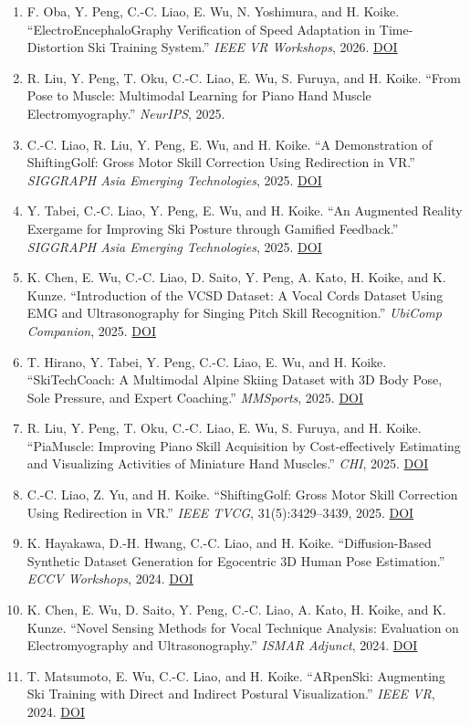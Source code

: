\documentclass[10pt,a4paper]{article}
\newcommand{\pub}[1]{\item #1}
\begin{document}
\begin{enumerate}
  \pub{F. Oba, Y. Peng, C.-C. Liao, E. Wu, N. Yoshimura, and H. Koike. ``ElectroEncephaloGraphy Verification of Speed Adaptation in Time-Distortion Ski Training System.'' \textit{IEEE VR Workshops}, 2026. \href{https://doi.org/10.1109/VRW70859.2026.00122}{DOI}}
  \pub{R. Liu, Y. Peng, T. Oku, C.-C. Liao, E. Wu, S. Furuya, and H. Koike. ``From Pose to Muscle: Multimodal Learning for Piano Hand Muscle Electromyography.'' \textit{NeurIPS}, 2025.}
  \pub{C.-C. Liao, R. Liu, Y. Peng, E. Wu, and H. Koike. ``A Demonstration of ShiftingGolf: Gross Motor Skill Correction Using Redirection in VR.'' \textit{SIGGRAPH Asia Emerging Technologies}, 2025. \href{https://doi.org/10.1145/3757373.3763777}{DOI}}
  \pub{Y. Tabei, C.-C. Liao, Y. Peng, E. Wu, and H. Koike. ``An Augmented Reality Exergame for Improving Ski Posture through Gamified Feedback.'' \textit{SIGGRAPH Asia Emerging Technologies}, 2025. \href{https://doi.org/10.1145/3757373.3763774}{DOI}}
  \pub{K. Chen, E. Wu, C.-C. Liao, D. Saito, Y. Peng, A. Kato, H. Koike, and K. Kunze. ``Introduction of the VCSD Dataset: A Vocal Cords Dataset Using EMG and Ultrasonography for Singing Pitch Skill Recognition.'' \textit{UbiComp Companion}, 2025. \href{https://doi.org/10.1145/3714394.3754407}{DOI}}
  \pub{T. Hirano, Y. Tabei, Y. Peng, C.-C. Liao, E. Wu, and H. Koike. ``SkiTechCoach: A Multimodal Alpine Skiing Dataset with 3D Body Pose, Sole Pressure, and Expert Coaching.'' \textit{MMSports}, 2025. \href{https://doi.org/10.1145/3728423.3759413}{DOI}}
  \pub{R. Liu, Y. Peng, T. Oku, C.-C. Liao, E. Wu, S. Furuya, and H. Koike. ``PiaMuscle: Improving Piano Skill Acquisition by Cost-effectively Estimating and Visualizing Activities of Miniature Hand Muscles.'' \textit{CHI}, 2025. \href{https://doi.org/10.1145/3706598.3713465}{DOI}}
  \pub{C.-C. Liao, Z. Yu, and H. Koike. ``ShiftingGolf: Gross Motor Skill Correction Using Redirection in VR.'' \textit{IEEE TVCG}, 31(5):3429--3439, 2025. \href{https://doi.org/10.1109/TVCG.2025.3549170}{DOI}}
  \pub{K. Hayakawa, D.-H. Hwang, C.-C. Liao, and H. Koike. ``Diffusion-Based Synthetic Dataset Generation for Egocentric 3D Human Pose Estimation.'' \textit{ECCV Workshops}, 2024. \href{https://doi.org/10.1007/978-3-031-91907-7_14}{DOI}}
  \pub{K. Chen, E. Wu, D. Saito, Y. Peng, C.-C. Liao, A. Kato, H. Koike, and K. Kunze. ``Novel Sensing Methods for Vocal Technique Analysis: Evaluation on Electromyography and Ultrasonography.'' \textit{ISMAR Adjunct}, 2024. \href{https://doi.org/10.1109/ISMAR-Adjunct64951.2024.00034}{DOI}}
  \pub{T. Matsumoto, E. Wu, C.-C. Liao, and H. Koike. ``ARpenSki: Augmenting Ski Training with Direct and Indirect Postural Visualization.'' \textit{IEEE VR}, 2024. \href{https://doi.org/10.1109/VR58804.2024.00024}{DOI}}

\end{enumerate}
\end{document}
